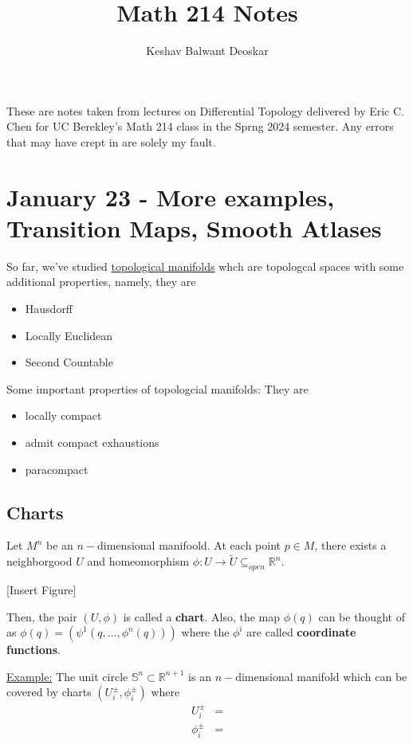 \documentclass{article}
\title{Math 214 Notes}
\author{Keshav Balwant Deoskar}
\begin{document}
\maketitle

These are notes taken from lectures on Differential Topology delivered by Eric C. Chen for UC Berekley's Math 214 class in the Sprng 2024 semester. Any errors that may have crept in are solely my fault.

\tableofcontents

\pagebreak

\section{January 23 - More examples, Transition Maps, Smooth Atlases}
\vskip 0.5cm

So far, we've studied \underline{topological manifolds} whch are topologcal spaces with some additional properties, namely, they are
\begin{itemize}
  \item Hausdorff
  \item Locally Euclidean
  \item Second Countable
\end{itemize}

\vskip 0.5cm
Some important properties of topologcial manifolds: They are
\begin{itemize}
  \item locally compact
  \item admit compact exhaustions
  \item paracompact
\end{itemize}

\vskip 1cm
\subsection{Charts}
Let $M^n$ be an $n-$dimensional manifoold. At each point $p \in M$, there exists a neighborgood $U$ and homeomorphism $\phi : U \rightarrow \tilde{U} \subseteq_{open} \mathbb{R}^n$.

\vskip 0.5cm
[Insert Figure]

\vskip 0.5cm
Then, the pair $(U, \phi)$ is called a \textbf{chart}. Also, the map $\phi(q)$ can be thought of as $\phi(q) = (\psi^1(q, \dots, \phi^n(q)))$ where the $\phi^i$ are called \textbf{coordinate functions}.

\vskip 0.5cm
\begin{dottedbox}
  \underline{Example:} The unit circle $\mathbb{S}^n \subset \mathbb{R}^{n+1}$ is an $n-$dimensional manifold which can be covered by charts $(U_i^{\pm}, \phi_i^{\pm})$ where 
  \begin{align*}
    U_i^{\pm} &= \\
    \phi_i^{\pm} &= 
  \end{align*}
\end{dottedbox}
\end{document}
